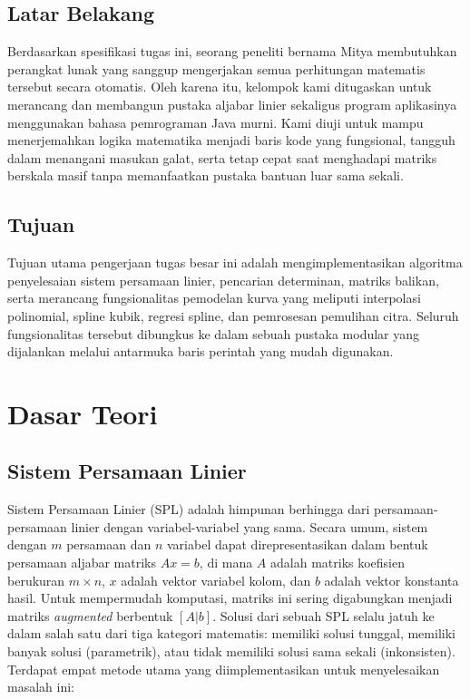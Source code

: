\documentclass[12pt, a4paper]{article}
\begin{document}
\subsection{Latar Belakang}
Berdasarkan spesifikasi tugas ini, seorang peneliti bernama Mitya membutuhkan perangkat lunak yang sanggup mengerjakan semua perhitungan matematis tersebut secara otomatis. Oleh karena itu, kelompok kami ditugaskan untuk merancang dan membangun pustaka aljabar linier sekaligus program aplikasinya menggunakan bahasa pemrograman Java murni. Kami diuji untuk mampu menerjemahkan logika matematika menjadi baris kode yang fungsional, tangguh dalam menangani masukan galat, serta tetap cepat saat menghadapi matriks berskala masif tanpa memanfaatkan pustaka bantuan luar sama sekali.

\subsection{Tujuan}
Tujuan utama pengerjaan tugas besar ini adalah mengimplementasikan algoritma penyelesaian sistem persamaan linier, pencarian determinan, matriks balikan, serta merancang fungsionalitas pemodelan kurva yang meliputi interpolasi polinomial, spline kubik, regresi spline, dan pemrosesan pemulihan citra. Seluruh fungsionalitas tersebut dibungkus ke dalam sebuah pustaka modular yang dijalankan melalui antarmuka baris perintah yang mudah digunakan.


\section{Dasar Teori}

\subsection{Sistem Persamaan Linier}
Sistem Persamaan Linier (SPL) adalah himpunan berhingga dari persamaan-persamaan linier dengan variabel-variabel yang sama. Secara umum, sistem dengan $m$ persamaan dan $n$ variabel dapat direpresentasikan dalam bentuk persamaan aljabar matriks $Ax = b$, di mana $A$ adalah matriks koefisien berukuran $m \times n$, $x$ adalah vektor variabel kolom, dan $b$ adalah vektor konstanta hasil. Untuk mempermudah komputasi, matriks ini sering digabungkan menjadi matriks \textit{augmented} berbentuk $[A|b]$. Solusi dari sebuah SPL selalu jatuh ke dalam salah satu dari tiga kategori matematis: memiliki solusi tunggal, memiliki banyak solusi (parametrik), atau tidak memiliki solusi sama sekali (inkonsisten). Terdapat empat metode utama yang diimplementasikan untuk menyelesaikan masalah ini:
\end{document}
